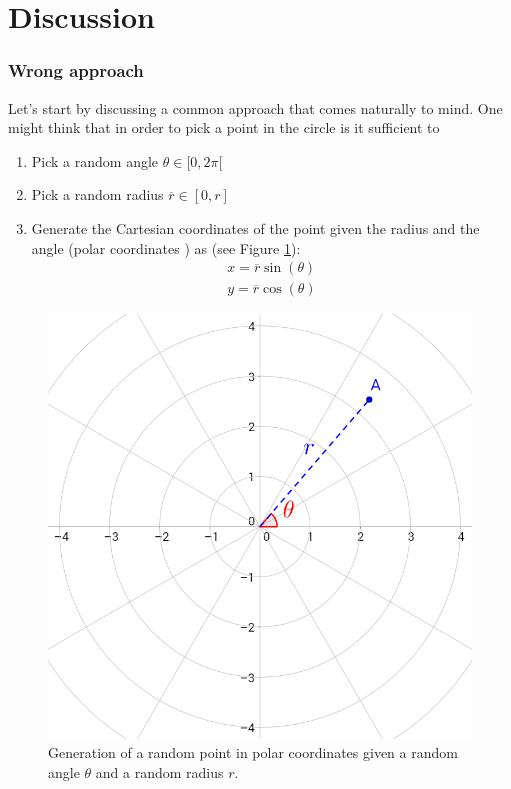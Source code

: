 \section{Discussion}
\label{random_points_in_circle:sec:discussion}

\subsubsection{Wrong approach}
\label{random_points_in_circle:sec:buggy}
Let's start by discussing a common approach that comes naturally to mind. One might think that in order to pick a point in the circle is it sufficient to 
\begin{enumerate}
	\item Pick a random angle $\theta \in [0, 2\pi[ $
	\item Pick a random radius $\overline{r} \in [0,r]$
	\item Generate the Cartesian coordinates of the point given the radius and the angle (polar coordinates \cite{cit:wiki:polar_coordinates}) as (see Figure \ref{fig:random_points_in_cirle:polar_coordinates}):
	\begin{gather*}
		 x=\overline{r}\sin(\theta) \\
		 y=\overline{r}\cos(\theta) 
	\end{gather*}
\end{enumerate}

\begin{figure}
	\label{fig:random_points_in_cirle:polar_coordinates}
	\centering
	\includegraphics[scale=0.3]{sources/random_points_in_circle/images/polar-coordinate}
	\caption{Generation of a random point in polar coordinates given a random angle $\theta$ and a random radius $r$.}
\end{figure}

